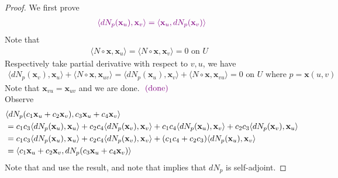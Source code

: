 \documentclass{report}
\begin{document}
\begin{proof}
We first prove 
\begin{align*}
\textcolor{violet}{\langle dN_p(\textbf{x}_u),\textbf{x}_v\rangle = \langle \textbf{x}_u , dN_p (\textbf{x}_v)\rangle }
\end{align*}
Note that 
\begin{align*}
\langle N \circ \textbf{x},\textbf{x}_u\rangle = \langle N\circ \textbf{x},\textbf{x}_v\rangle = 0\text{ on  $U$ }
\end{align*}
Respectively take partial derivative with respect to $v,u$, we have 
 \begin{align*}
\langle dN_p(\textbf{x}_v),\textbf{x}_u\rangle + \langle N\circ \textbf{x}, \textbf{x}_{uv}\rangle = \langle dN_p(\textbf{x}_u),\textbf{x}_v\rangle + \langle N\circ \textbf{x}, \textbf{x}_{vu}\rangle =0 \text{ on $U$ where  $p=\textbf{x}(u,v)$ }
\end{align*}
Note that $\textbf{x}_{vu}=\textbf{x}_{uv}$ and we are done. $\textcolor{violet}{\text{ (done) }}$\\

Observe 
\begin{align}
&\langle dN_p(c_1\textbf{x}_u +c_2 \textbf{x}_v),c_3\textbf{x}_u+c_4\textbf{x}_v\rangle \notag\\
&=c_1c_3 \langle dN_p(\textbf{x}_u),\textbf{x}_u\rangle + c_2c_4 \langle dN_p(\textbf{x}_v),\textbf{x}_v\rangle + c_1c_4\langle dN_p(\textbf{x}_u), \textbf{x}_v\rangle + c_2c_3 \langle dN_p(\textbf{x}_v),\textbf{x}_u\rangle \notag  \\
&=c_1c_3 \langle dN_p(\textbf{x}_u),\textbf{x}_u\rangle + c_2c_4 \langle dN_p(\textbf{x}_v),\textbf{x}_v\rangle + (c_1c_4+c_2c_3)\langle dN_p(\textbf{x}_u),\textbf{x}_v\rangle \label{xuv} \\
&=\langle c_1\textbf{x}_u+c_2\textbf{x}_v, dN_p(c_3\textbf{x}_u+c_4\textbf{x}_v)\rangle \label{xuv2}
\end{align}
Note that  and  use the  result, and note that  implies that $dN_p$ is self-adjoint. 
\end{proof}
\end{document}
